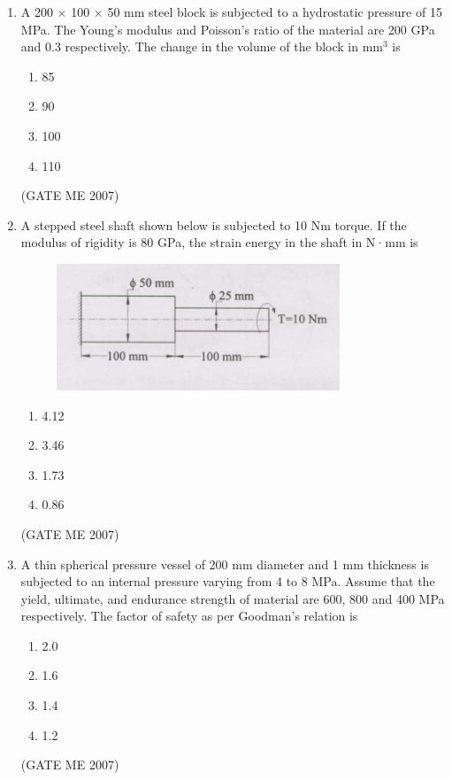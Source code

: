 \documentclass[journal]{IEEEtran}
\begin{document}
\begin{enumerate}
\item A 200 × 100 × 50 mm steel block is subjected to a hydrostatic pressure of 15 MPa. The Young’s modulus and Poisson’s ratio of the material are 200 GPa and 0.3 respectively. The change in the volume of the block in mm$^3$ is
\begin{multicols}{4}
\begin{enumerate}
\item 85
\item 90
\item 100
\item 110
\end{enumerate}
\end{multicols}
\hfill (GATE ME 2007)

\item A stepped steel shaft shown below is subjected to 10 Nm torque. If the modulus of rigidity is 80 GPa, the strain energy in the shaft in N·mm is

\begin{figure}[H]
    \centering
    \includegraphics[width=0.8\textwidth]{Fig 4.png}
    \caption{}
    \label{fig:question45}
\end{figure}

\begin{multicols}{4}
\begin{enumerate}
\item 4.12
\item 3.46
\item 1.73
\item 0.86
\end{enumerate}
\end{multicols}
\hfill (GATE ME 2007)

\item A thin spherical pressure vessel of 200 mm diameter and 1 mm thickness is subjected to an internal pressure varying from 4 to 8 MPa. Assume that the yield, ultimate, and endurance strength of material are 600, 800 and 400 MPa respectively. The factor of safety as per Goodman’s relation is
\begin{multicols}{4}
\begin{enumerate}
\item 2.0
\item 1.6
\item 1.4
\item 1.2
\end{enumerate}
\end{multicols}
\hfill (GATE ME 2007)


\end{enumerate}
\end{document}
